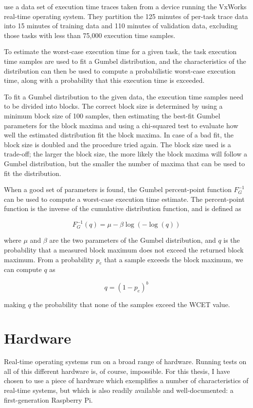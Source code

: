 \documentclass[twoside]{uva-inf-bachelor-thesis}
\begin{document}
\citeauthor*{hansen_et_al:wcet} use a data set of execution time traces taken from a device running the VxWorks real-time operating system. They partition the 125 minutes of per-task trace data into 15 minutes of training data and 110 minutes of validation data, excluding those tasks with less than 75,000 execution time samples.

To estimate the worst-case execution time for a given task, the task execution time samples are used to fit a Gumbel distribution, and the characteristics of the distribution can then be used to compute a probabilistic worst-case execution time, along with a probability that this execution time is exceeded.

To fit a Gumbel distribution to the given data, the execution time samples need to be divided into blocks. The correct block size is determined by using a minimum block size of 100 samples, then estimating the best-fit Gumbel parameters for the block maxima and using a chi-squared test to evaluate how well the estimated distribution fit the block maxima. In case of a bad fit, the block size is doubled and the procedure tried again. The block size used is a trade-off; the larger the block size, the more likely the block maxima will follow a Gumbel distribution, but the smaller the number of maxima that can be used to fit the distribution.

When a good set of parameters is found, the Gumbel percent-point function $F_G^{-1}$ can be used to compute a worst-case execution time estimate. The percent-point function is the inverse of the cumulative distribution function, and is defined as

\[ F_G^{-1}(q) = \mu - \beta \log(-\log (q)) \] 

\noindent where $\mu$ and $\beta$ are the two parameters of the Gumbel distribution, and $q$ is the probability that a measured block maximum does not exceed the returned block maximum. From a probability $p_e$ that a sample exceeds the block maximum, we can compute $q$ as

\[ q = (1 - p_e)^b \] 

\noindent making $q$ the probability that none of the samples exceed the WCET value.


%
%
%
%

\chapter{Hardware} \label{chp:hardware}
Real-time operating systems run on a broad range of hardware. Running tests on all of this different hardware is, of course, impossible. For this thesis, I have chosen to use a piece of hardware which exemplifies a number of characteristics of real-time systems, but which is also readily available and well-documented: a first-generation Raspberry Pi.
\end{document}

